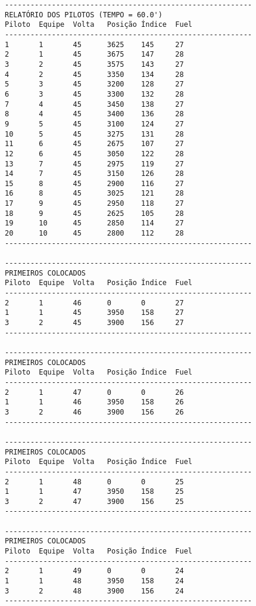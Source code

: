 \documentclass[12pt]{article}
\begin{document}
\begin{verbatim}
----------------------------------------------------------
RELATÓRIO DOS PILOTOS (TEMPO = 60.0')
Piloto  Equipe  Volta   Posição Índice  Fuel
----------------------------------------------------------
1       1       45      3625    145     27
2       1       45      3675    147     28
3       2       45      3575    143     27
4       2       45      3350    134     28
5       3       45      3200    128     27
6       3       45      3300    132     28
7       4       45      3450    138     27
8       4       45      3400    136     28
9       5       45      3100    124     27
10      5       45      3275    131     28
11      6       45      2675    107     27
12      6       45      3050    122     28
13      7       45      2975    119     27
14      7       45      3150    126     28
15      8       45      2900    116     27
16      8       45      3025    121     28
17      9       45      2950    118     27
18      9       45      2625    105     28
19      10      45      2850    114     27
20      10      45      2800    112     28
----------------------------------------------------------

----------------------------------------------------------
PRIMEIROS COLOCADOS
Piloto  Equipe  Volta   Posição Índice  Fuel
----------------------------------------------------------
2       1       46      0       0       27
1       1       45      3950    158     27
3       2       45      3900    156     27
----------------------------------------------------------

----------------------------------------------------------
PRIMEIROS COLOCADOS
Piloto  Equipe  Volta   Posição Índice  Fuel
----------------------------------------------------------
2       1       47      0       0       26
1       1       46      3950    158     26
3       2       46      3900    156     26
----------------------------------------------------------

----------------------------------------------------------
PRIMEIROS COLOCADOS
Piloto  Equipe  Volta   Posição Índice  Fuel
----------------------------------------------------------
2       1       48      0       0       25
1       1       47      3950    158     25
3       2       47      3900    156     25
----------------------------------------------------------

----------------------------------------------------------
PRIMEIROS COLOCADOS
Piloto  Equipe  Volta   Posição Índice  Fuel
----------------------------------------------------------
2       1       49      0       0       24
1       1       48      3950    158     24
3       2       48      3900    156     24
----------------------------------------------------------


\end{verbatim}
\end{document}
